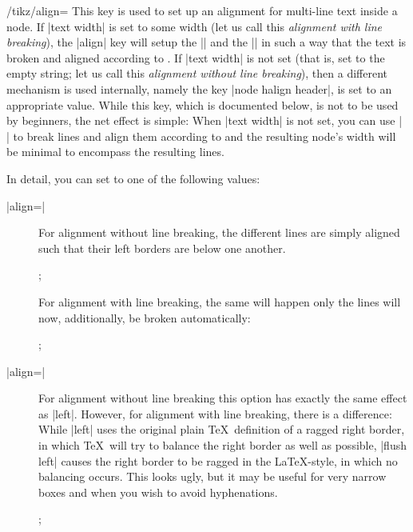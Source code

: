 \begin{key}{/tikz/align=}
  This key is used to set up an alignment for multi-line text inside a
  node. If |text width| is set to some width (let us call this
  \emph{alignment with line breaking}), the |align| key will
  setup the |\leftskip| and the |\rightskip| in such a way that the
  text is broken and aligned according to . If |text width|
  is not set (that is, set to the empty string; let us call this
  \emph{alignment without line breaking}), then a different
  mechanism is used internally, namely the key |node halign header|, is
  set to an appropriate value. While this key, which is documented
  below, is not to be used by beginners, the net effect is simple:
  When |text width| is not set, you can use |\\| to break lines and
  align them according to  and the resulting node's width
  will be minimal to encompass the resulting lines.

  In detail, you can set  to one of the following values:
  \begin{description}
  \item[|align=|]
    For alignment without line breaking, the different lines are simply
    aligned such that their left borders are below one another.
\begin{codeexample}[]
\tikz {};
\end{codeexample}
    For alignment with line breaking, the same will happen only
    the lines will now, additionally, be broken automatically:
\begin{codeexample}[]
\tikz {};
\end{codeexample}

  \item[|align=|]
    For alignment without line breaking this option has exactly the
    same effect as |left|. However, for alignment with line breaking,
    there is a difference: While |left| uses the
    original plain \TeX\ definition of a ragged right border, in which
    \TeX\ will try to balance the right border as well as possible,
    |flush left| causes the right border to be ragged in the
    \LaTeX-style, in which no balancing occurs. This looks ugly, but
    it may be useful for very narrow boxes and when you wish to avoid
    hyphenations.
\begin{codeexample}[]
\tikz {};
\end{codeexample}


\end{description}
\end{key}

